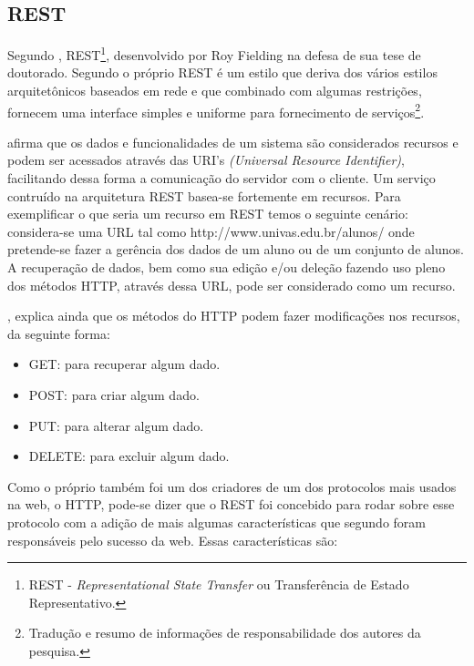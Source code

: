 	\subsection{REST}
	
			\par Segundo , REST\footnote{REST -
			\textit{Representational State Transfer} ou Transferência de Estado
			Representativo.}, desenvolvido por Roy Fielding na defesa de sua tese de
			doutorado. Segundo o próprio  REST é um estilo que
			deriva dos vários estilos arquitetônicos baseados em rede e  que combinado
			com algumas restrições, fornecem uma interface simples e uniforme para
			fornecimento de serviços\footnote{Tradução e resumo de informações de
			responsabilidade dos autores da pesquisa.}.
			
			\par {} afirma que os dados e funcionalidades de um
			sistema são considerados recursos e podem ser acessados através das URI's
		\textit{(Universal Resource Identifier)}, facilitando dessa forma a comunicação
		do servidor com o cliente. Um serviço contruído na arquitetura REST
		basea-se fortemente em recursos. Para exemplificar o que seria um recurso em
		REST temos o seguinte cenário: considera-se uma URL tal como 
		http://www.univas.edu.br/alunos/ onde pretende-se fazer a gerência dos dados
		de um aluno ou de um conjunto de alunos. A recuperação de dados, bem como sua
		edição e/ou deleção fazendo uso pleno dos métodos HTTP, através dessa URL,
		pode ser considerado como um recurso.
			\par {}, explica ainda que os métodos do HTTP podem fazer
		modificações nos recursos, da seguinte forma:
			
			 \begin{itemize}
			   \item GET: para recuperar algum dado. 
			   \item POST: para criar algum dado.
			   \item PUT: para alterar algum dado. 
			   \item DELETE: para excluir algum dado. 
			 \end{itemize}
			 	
			\par Como o próprio  também foi um dos criadores de um
		dos protocolos mais usados na web, o HTTP, pode-se dizer que o REST foi
		concebido para rodar sobre esse protocolo com a adição de mais algumas
		características que segundo  foram responsáveis pelo
		sucesso da web. Essas características são:
		
